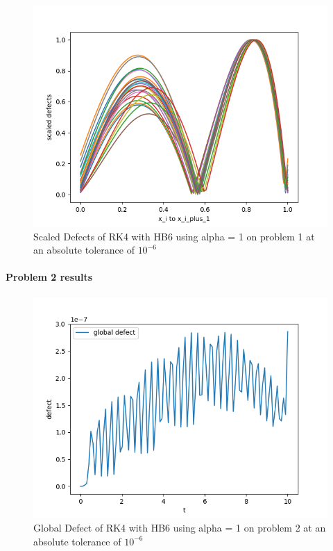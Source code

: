 \documentclass{article}
\begin{document}
\begin{figure}[H]
\centering
\includegraphics[width=0.7\linewidth]{./figures/static_alpha_rk4_with_hb6_p1_scaled_defects}
\caption{Scaled Defects of RK4 with HB6 using alpha = 1 on problem 1 at an absolute tolerance of $10^{-6}$}
\label{fig:static_alpha_rk4_with_hb6_p1_scaled_defects}
\end{figure}

\paragraph{Problem 2 results}
\begin{figure}[H]
\centering
\includegraphics[width=0.7\linewidth]{./figures/static_alpha_rk4_with_hb6_p2_global_defect}
\caption{Global Defect of RK4 with HB6 using alpha = 1 on problem 2 at an absolute tolerance of $10^{-6}$}
\label{fig:static_alpha_rk4_with_hb6_p2_global_defect}
\end{figure}
\end{document}
